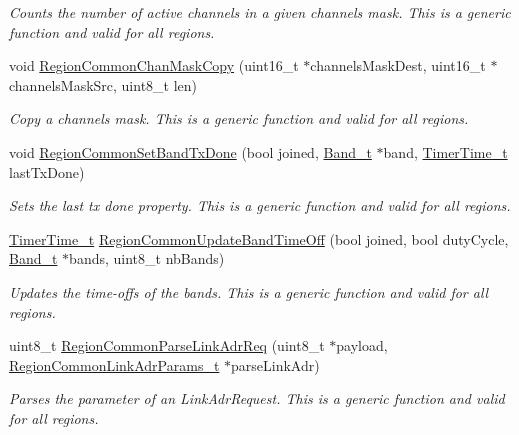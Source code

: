 \begin{DoxyCompactItemize}
\begin{DoxyCompactList}\small\item\em Counts the number of active channels in a given channels mask. This is a generic function and valid for all regions. \end{DoxyCompactList}\item 
void \hyperlink{group__REGIONCOMMON_ga95f5199d490113269fae7f2e0569e9a0}{Region\+Common\+Chan\+Mask\+Copy} (uint16\+\_\+t $\ast$channels\+Mask\+Dest, uint16\+\_\+t $\ast$channels\+Mask\+Src, uint8\+\_\+t len)
\begin{DoxyCompactList}\small\item\em Copy a channels mask. This is a generic function and valid for all regions. \end{DoxyCompactList}\item 
void \hyperlink{group__REGIONCOMMON_ga491dea5590228a0cd33affd71743779c}{Region\+Common\+Set\+Band\+Tx\+Done} (bool joined, \hyperlink{group__LORAMAC_ga8f49721ee96ceb52c80a896ab11a2ed8}{Band\+\_\+t} $\ast$band, \hyperlink{utilities_8h_a4215ca43d3e953099ea758ce428599d0}{Timer\+Time\+\_\+t} last\+Tx\+Done)
\begin{DoxyCompactList}\small\item\em Sets the last tx done property. This is a generic function and valid for all regions. \end{DoxyCompactList}\item 
\hyperlink{utilities_8h_a4215ca43d3e953099ea758ce428599d0}{Timer\+Time\+\_\+t} \hyperlink{group__REGIONCOMMON_ga2e26fe6b49ca26edf7052eadd7f18b3a}{Region\+Common\+Update\+Band\+Time\+Off} (bool joined, bool duty\+Cycle, \hyperlink{group__LORAMAC_ga8f49721ee96ceb52c80a896ab11a2ed8}{Band\+\_\+t} $\ast$bands, uint8\+\_\+t nb\+Bands)
\begin{DoxyCompactList}\small\item\em Updates the time-\/offs of the bands. This is a generic function and valid for all regions. \end{DoxyCompactList}\item 
uint8\+\_\+t \hyperlink{group__REGIONCOMMON_ga8403c78482dbb901014dba48b75d78e8}{Region\+Common\+Parse\+Link\+Adr\+Req} (uint8\+\_\+t $\ast$payload, \hyperlink{group__REGIONCOMMON_ga6e1aaa6b8d179e2daffac8d1e23d7f24}{Region\+Common\+Link\+Adr\+Params\+\_\+t} $\ast$parse\+Link\+Adr)
\begin{DoxyCompactList}\small\item\em Parses the parameter of an Link\+Adr\+Request. This is a generic function and valid for all regions. \end{DoxyCompactList}\item 

\end{DoxyCompactItemize}
